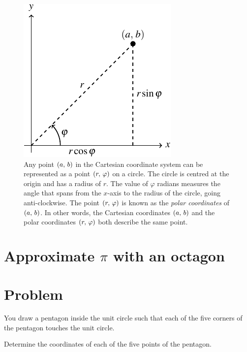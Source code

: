 \documentclass[a4paper,oneside,12pt]{article}
\begin{document}
\begin{figure}[!htbp]
\centering
\includegraphics[scale=1.1]{image/05/polar-cartesian.pdf}
\caption{%
  Any point $\left\lparen{a},\, {b}\right\rparen$ in the Cartesian coordinate system can be
  represented as a point $\left\lparen{r},\, {\varphi}\right\rparen$ on a circle.  The circle
  is centred at the origin and has a radius of $r$.  The value of
  $\varphi$ radians measures the angle that spans from the $x$-axis to
  the radius of the circle, going anti-clockwise.  The point
  $\left\lparen{r},\, {\varphi}\right\rparen$ is known as the \emph{polar coordinates} of
  $\left\lparen{a},\, {b}\right\rparen$.  In other words, the Cartesian coordinates
  $\left\lparen{a},\, {b}\right\rparen$ and the polar coordinates $\left\lparen{r},\, {\varphi}\right\rparen$ both
  describe the same point.
}
\label{fig:convert_from_polar_to_Cartesian_coordinates}
\end{figure}



\section{Approximate $\pi$ with an octagon}



\section*{Problem}

\begin{problem}
\item You draw a pentagon inside the unit circle such that each of the
  five corners of the pentagon touches the unit circle.
  \begin{packedenum}
  \item Determine the coordinates of each of the five points of the
    pentagon.
  \end{packedenum}
\end{problem}
\end{document}
